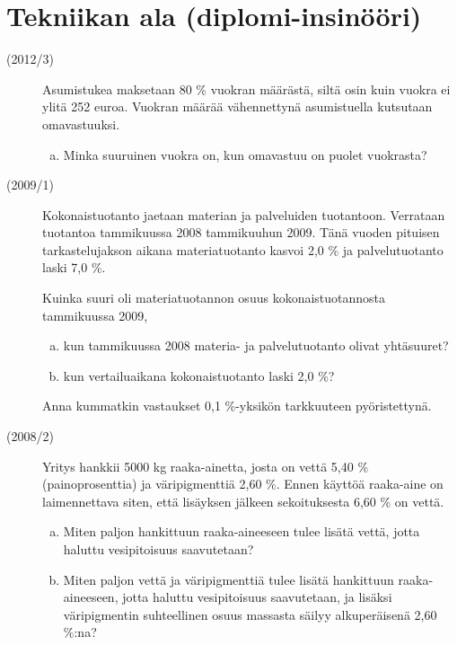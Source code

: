 \section{Tekniikan ala (diplomi-insinööri)}
\begin{description}
	\item[(2012/3)] Asumistukea maksetaan 80 \% vuokran määrästä, siltä osin kuin
        vuokra ei ylitä 252 euroa. Vuokran määrää vähennettynä asumistuella
        kutsutaan omavastuuksi.
        
		\begin{enumerate}[(a)]
			\item Minka suuruinen vuokra on, kun omavastuu on puolet vuokrasta?
		\end{enumerate}
	
	\item[(2009/1)] Kokonaistuotanto jaetaan materian ja palveluiden tuotantoon.
        Verrataan tuotantoa tammikuussa 2008 tammikuuhun 2009. Tänä vuoden pituisen
        tarkastelujakson aikana materiatuotanto kasvoi 2,0 \% ja palvelutuotanto laski 7,0 \%.
	
	   Kuinka suuri oli materiatuotannon osuus kokonaistuotannosta tammikuussa 2009,
	   
    	\begin{enumerate}[(a)]
    		\item kun tammikuussa 2008 materia- ja palvelutuotanto olivat yhtäsuuret?
    		\item kun vertailuaikana kokonaistuotanto laski 2,0 \%?
    	\end{enumerate}
    	
	   Anna kummatkin vastaukset 0,1 \%-yksikön tarkkuuteen pyöristettynä.

	\item[(2008/2)] Yritys hankkii 5000 kg raaka-ainetta, josta on vettä 5,40 \%
        (painoprosenttia) ja väripigmenttiä 2,60 \%. Ennen käyttöä raaka-aine on
        laimennettava siten, että lisäyksen jälkeen sekoituksesta 6,60 \% on vettä.
	
    	\begin{enumerate}[(a)]
    		\item Miten paljon hankittuun raaka-aineeseen tulee lisätä vettä,
                jotta haluttu vesipitoisuus saavutetaan?
    		\item Miten paljon vettä ja väripigmenttiä tulee lisätä hankittuun
                raaka-aineeseen, jotta haluttu vesipitoisuus saavutetaan, ja lisäksi
                väripigmentin suhteellinen osuus massasta säilyy alkuperäisenä 2,60 \%:na?
    	\end{enumerate}
    	

\end{description}
